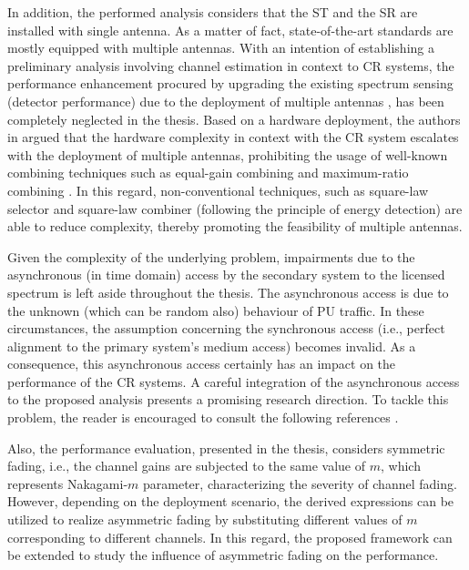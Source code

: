 In addition, the performed analysis considers that the ST and the SR are installed with single antenna. As a matter of fact, state-of-the-art standards are mostly equipped with multiple antennas. With an intention of establishing a preliminary analysis involving channel estimation in context to CR systems, the performance enhancement procured by upgrading the existing spectrum sensing (detector performance) due to the deployment of multiple antennas \cite{Dig07,Tah10}, has been completely neglected in the thesis. Based on a hardware deployment, the authors in  argued that the hardware complexity in context with the CR system escalates with the deployment of multiple antennas, prohibiting the usage of well-known combining techniques such as equal-gain combining and maximum-ratio combining \cite{Alouini03}. In this regard, non-conventional techniques, such as square-law selector and square-law combiner (following the principle of energy detection) are able to reduce complexity, thereby promoting the feasibility of multiple antennas. 

Given the complexity of the underlying problem, impairments due to the asynchronous (in time domain) access by the secondary system to the licensed spectrum is left aside throughout the thesis. The asynchronous access is due to the unknown (which can be random also) behaviour of PU traffic. In these circumstances, the assumption concerning the synchronous access (i.e., perfect alignment to the primary system's medium access) becomes invalid. As a consequence, this asynchronous access certainly has an impact on the performance of the CR systems. A careful integration of the asynchronous access to the proposed analysis presents a promising research direction. To tackle this problem, the reader is encouraged to consult the following references \cite{Jiang13_, Jiang15}.

Also, the performance evaluation, presented in the thesis, considers symmetric fading, i.e., the channel gains are subjected to the same value of $m$, which represents Nakagami-$m$ parameter, characterizing the severity of channel fading. However, depending on the deployment scenario, the derived expressions can be utilized to realize asymmetric fading \cite{Sura08} by substituting different values of $m$ corresponding to different channels. In this regard, the proposed framework can be extended to study the influence of asymmetric fading on the performance. 

